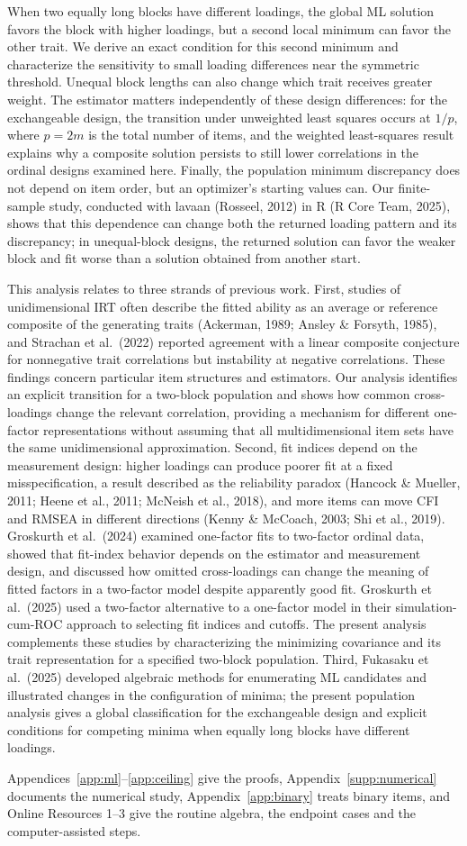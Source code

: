 When two equally long blocks have different loadings, the global ML solution favors the block with higher loadings, but a second local minimum can favor the other trait. We derive an exact condition for this second minimum and characterize the sensitivity to small loading differences near the symmetric threshold. Unequal block lengths can also change which trait receives greater weight. The estimator matters independently of these design differences: for the exchangeable design, the transition under unweighted least squares occurs at $1/p$, where $p=2m$ is the total number of items, and the weighted least-squares result explains why a composite solution persists to still lower correlations in the ordinal designs examined here. Finally, the population minimum discrepancy does not depend on item order, but an optimizer's starting values can. Our finite-sample study, conducted with lavaan (Rosseel, 2012) in R (R Core Team, 2025), shows that this dependence can change both the returned loading pattern and its discrepancy; in unequal-block designs, the returned solution can favor the weaker block and fit worse than a solution obtained from another start.

This analysis relates to three strands of previous work. First, studies of unidimensional IRT often describe the fitted ability as an average or reference composite of the generating traits (Ackerman, 1989; Ansley \& Forsyth, 1985), and Strachan et al.\ (2022) reported agreement with a linear composite conjecture for nonnegative trait correlations but instability at negative correlations. These findings concern particular item structures and estimators. Our analysis identifies an explicit transition for a two-block population and shows how common cross-loadings change the relevant correlation, providing a mechanism for different one-factor representations without assuming that all multidimensional item sets have the same unidimensional approximation. Second, fit indices depend on the measurement design: higher loadings can produce poorer fit at a fixed misspecification, a result described as the reliability paradox (Hancock \& Mueller, 2011; Heene et al., 2011; McNeish et al., 2018), and more items can move CFI and RMSEA in different directions (Kenny \& McCoach, 2003; Shi et al., 2019). Groskurth et al.\ (2024) examined one-factor fits to two-factor ordinal data, showed that fit-index behavior depends on the estimator and measurement design, and discussed how omitted cross-loadings can change the meaning of fitted factors in a two-factor model despite apparently good fit. Groskurth et al.\ (2025) used a two-factor alternative to a one-factor model in their simulation-cum-ROC approach to selecting fit indices and cutoffs. The present analysis complements these studies by characterizing the minimizing covariance and its trait representation for a specified two-block population. Third, Fukasaku et al.\ (2025) developed algebraic methods for enumerating ML candidates and illustrated changes in the configuration of minima; the present population analysis gives a global classification for the exchangeable design and explicit conditions for competing minima when equally long blocks have different loadings.

Appendices~\ref{app:ml}--\ref{app:ceiling} give the proofs, Appendix~\ref{supp:numerical} documents the numerical study, Appendix~\ref{app:binary} treats binary items, and Online Resources 1--3 give the routine algebra, the endpoint cases and the computer-assisted steps.
